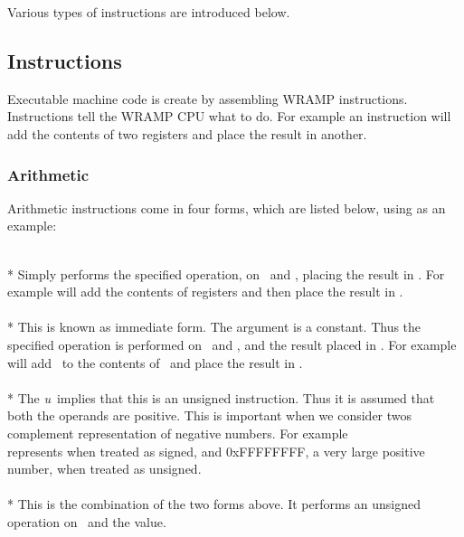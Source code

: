 Various types of instructions are introduced below.

\subsection{Instructions}

Executable machine code is create by assembling WRAMP instructions.
Instructions tell the WRAMP CPU what to do.  For example an  
instruction will add the contents of two registers and place the result 
in another.

\subsubsection{Arithmetic}
Arithmetic instructions come in four forms, which are listed 
below, using  as an example:


 \\*
  Simply performs the specified operation,
  on \regs\ and \regt, placing the result in \regd.  For example 
  \mbox{} will add the contents of registers
   and  then place the result in .
  \\

 \\* 
  This is known as immediate form.
  The argument  is a constant.  Thus the specified
  operation is performed on \regs\ and , and the result
  placed in \regd.  For example \mbox{} will add
  \ to the contents of \ and place the result in
  .  
  \\

 \\* 
  The \emph{u}\ implies that this is
  an unsigned instruction.  Thus it is assumed that both the operands
  are positive.  This is important when we consider twos complement
  representation of negative numbers.  For example \\ \mbox{} represents  when
  treated as signed, and 0xFFFFFFFF, a very large positive number,
  when treated as unsigned.  \\

 \\*
  This is the combination of the two forms above.  It performs an unsigned
  operation on \regs\ and the  value.
  \\

